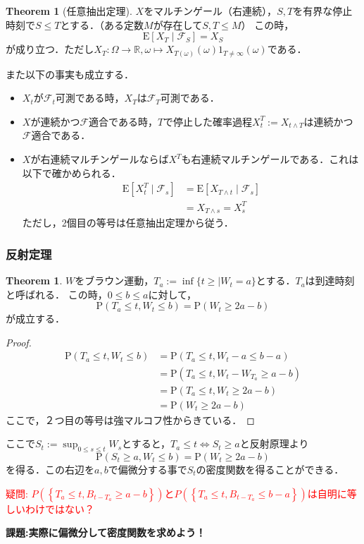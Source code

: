 \documentclass{jsarticle}
\theoremstyle{definition}
\newtheorem{thm}[dfn]{Theorem}
\begin{document}
\begin{thm}[任意抽出定理]
    $X$をマルチンゲール（右連続），$S, T$を有界な停止時刻で$S\leq T$とする．（ある定数$M$が存在して$S, T\leq M$）
    この時，
    $$
        \mathrm{E}\left[X_T \mid \mathscr{F}_S\right] = X_S
    $$
    が成り立つ．ただし$X_T: \Omega \rightarrow \mathbb{R}, \omega \mapsto X_{T(\omega)}(\omega) 1_{T \neq \infty}(\omega)$である．
\end{thm}
また以下の事実も成立する．
\begin{itemize}
    \item $X_t$が$\mathscr{F}_t$可測である時，$X_T$は$\mathscr{F}_T$可測である．
    \item $X$が連続かつ$\mathscr{F}$適合である時，$T$で停止した確率過程$X_t^T := X_{t\land T}$は連続かつ$\mathscr{F}$適合である．
    \item $X$が右連続マルチンゲールならば$X^T$も右連続マルチンゲールである．これは以下で確かめられる．
            \begin{align*}
                \mathrm{E}\left[X_t^T \mid \mathscr{F}_s\right] &= \mathrm{E}\left[X_{T\land t} \mid \mathscr{F}_s\right]\\
                &= X_{T\land s} = X^T_s
            \end{align*}
            ただし，2個目の等号は任意抽出定理から従う．
\end{itemize}

\subsubsection{反射定理}
\begin{thm}
    $W$をブラウン運動，$T_a := \inf\{t\geq \mid W_t = a\}$とする．$T_a$は到達時刻と呼ばれる．
    この時，$0 \leq b \leq a$に対して，
    $$
        \mathrm{P}\left(T_a \leq t, W_t \leq b\right) = \mathrm{P}\left(W_t \geq 2a - b\right)
    $$
    が成立する．
\end{thm}
\begin{proof}
    \begin{align*}
        \mathrm{P}\left(T_a \leq t, W_t \leq b\right) &= \mathrm{P}\left(T_a \leq t, W_{t} - a \leq b - a\right)\\
        &= \mathrm{P}\left(T_a \leq t, W_{t}-W_{T_a} \geq a - b\right)\\
        &= \mathrm{P}\left(T_a \leq t, W_{t} \geq 2a - b\right)\\
        &= \mathrm{P}\left(W_{t} \geq 2a - b\right)
    \end{align*}
    ここで，２つ目の等号は強マルコフ性からきている．
\end{proof}
ここで$S_t := \sup_{0 \leq s \leq t} W_s$とすると，$T_a \leq t \iff S_t \geq a$と反射原理より
$$
    \mathrm{P}\left(S_t \geq a, W_t \leq b\right) = \mathrm{P}\left(W_{t} \geq 2a - b\right)
$$
を得る．この右辺を$a, b$で偏微分する事で$S_t$の密度関数を得ることができる．\par
\textcolor{red}{疑問: $P(\left\{T_a \leq t, B_{t - T_a} \geq a - b\right\})$と$P(\left\{T_a \leq t, B_{t - T_a} \leq b - a\right\})$は自明に等しいわけではない？}\par

\noindent
\textbf{課題:実際に偏微分して密度関数を求めよう！}
\end{document}
